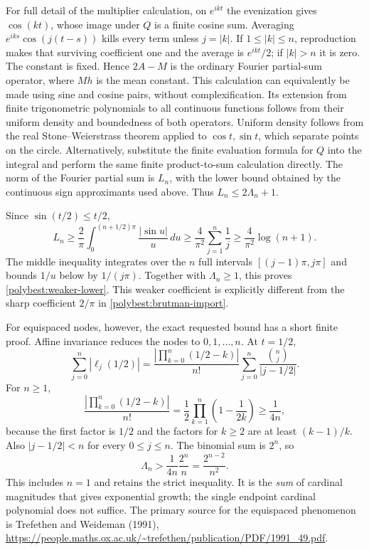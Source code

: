 \documentclass[11pt]{article}
\theoremstyle{remark}
\numberwithin{equation}{section}
\begin{document}
For full detail of the multiplier calculation, on $e^{ikt}$ the
evenization gives $\cos(kt)$, whose image under $Q$ is a finite cosine
sum.  Averaging $e^{iks}\cos(j(t-s))$ kills every term unless $j=|k|$.
If $1\le|k|\le n$, reproduction makes that surviving coefficient
one and the average is $e^{ikt}/2$; if $|k|>n$ it is zero.  The constant
is fixed.  Hence $2A-M$ is the ordinary Fourier partial-sum operator,
where $Mh$ is the mean constant.  This calculation can equivalently be
made using sine and cosine pairs, without complexification.  Its extension
from finite trigonometric polynomials to all continuous functions follows
from their uniform density and boundedness of both operators.  Uniform
density follows from the real Stone--Weierstrass theorem applied to
$\cos t,\sin t$, which separate points on the circle.  Alternatively,
substitute the finite evaluation formula for $Q$ into the integral and
perform the same finite product-to-sum calculation directly.
The norm of the Fourier partial sum is $L_n$, with the lower bound
obtained by the continuous sign approximants used above.  Thus
$L_n\le2\Lambda_n+1$.

Since $\sin(t/2)\le t/2$,
\[
 L_n\ge\frac2\pi\int_0^{(n+1/2)\pi}\frac{|\sin u|}{u}\,du
 \ge\frac4{\pi^2}\sum_{j=1}^n\frac1j
 \ge\frac4{\pi^2}\log(n+1).
\]
The middle inequality integrates over the $n$ full intervals
$[(j-1)\pi,j\pi]$ and bounds $1/u$ below by $1/(j\pi)$.
Together with $\Lambda_n\ge1$, this proves
\eqref{polybest:weaker-lower}.  This weaker coefficient is explicitly
different from the sharp coefficient $2/\pi$ in
\eqref{polybest:brutman-import}.

For equispaced nodes, however, the exact requested bound has a short
finite proof.  Affine invariance reduces the nodes to $0,1,\ldots,n$.
At $t=1/2$,
\[
 \sum_{j=0}^n|\ell_j(1/2)|
 =\frac{|\prod_{k=0}^n(1/2-k)|}{n!}
       \sum_{j=0}^n\frac{\binom nj}{|j-1/2|}.
\]
For $n\ge1$,
\[
 \frac{|\prod_{k=0}^n(1/2-k)|}{n!}
 =\frac12\prod_{k=1}^n\left(1-\frac1{2k}\right)
 \ge\frac1{4n},
\]
because the first factor is $1/2$ and the factors for $k\ge2$ are
at least $(k-1)/k$.  Also $|j-1/2|<n$ for every $0\le j\le n$.
The binomial sum is $2^n$, so
\[
 \Lambda_n>\frac1{4n}\frac{2^n}{n}
           =\frac{2^{n-2}}{n^2}.
\]
This includes $n=1$ and retains the strict inequality.  It is the
\emph{sum} of cardinal magnitudes that gives exponential growth;
the single endpoint cardinal polynomial does not suffice.
The primary source for the equispaced phenomenon is Trefethen and
Weideman (1991),
\url{https://people.maths.ox.ac.uk/~trefethen/publication/PDF/1991_49.pdf}.
\end{document}
